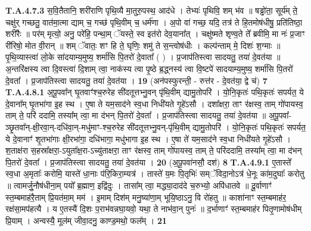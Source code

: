 \documentclass[17pt]{extarticle}
\begin{document}
                                                                  \textbf{ T.A.4.7.3} \newline
                  स॒वि॒तैतानि॒ शरी॑राणि पृथि॒व्यै मा॒तुरु॒पस्थ॒ आद॑धे । तेभ्यः॑ पृथिवि॒ शम् भ॑व ॥  षड्ढो॑ता॒ सूर्य॑म् ते॒ चक्षु॑र् गच्छतु॒ वात॑मा॒त्मा द्याम् च॒ गच्छ॑ पृथि॒वीम् च॒ धर्म॑णा ।  अ॒पो वा॑ गच्छ॒ यदि॒ तत्र॑ ते हि॒तमोष॑धीषु॒ प्रति॑तिष्ठा॒ शरी॑रैः ॥ पर॑म् मृत्यो॒ अनु॒ परे॑हि॒ पन्था॒म् ॅयस्ते॒ स्व इत॑रो देव॒याना᳚त् ।  चक्षु॑ष्मते शृण्व॒ते ते᳚ ब्रवीमि॒ मा नः॑ प्र॒जाꣳ री॑रिषो॒ मोत वी॒रान् ॥  शम् ॅवातः॒ शꣳ हि ते॒ घृणिः॒ शमु॑ ते स॒न्त्वोष॑धीः । कल्प॑न्ताम् मे॒ दिशः॑ श॒ग्माः ॥  पृ॒थि॒व्यास्त्वा॑ लो॒के सा॑दयाम्य॒मुष्य॒ शर्मा॑सि पि॒तरो॑ दे॒वाता᳚ ( ) । प्र॒जाप॑तिस्त्वा सादयतु॒ तया॑ दे॒वत॑या ॥ अ॒न्तरि॑क्षस्य त्वा दि॒वस्त्वा॑ दि॒शाम् त्वा॒ नाक॑स्य त्वा पृ॒ष्ठे ब्र॒द्ध्नस्य॑ त्वा वि॒ष्टपे॑ सादयाम्य॒मुष्य॒ शर्मा॑सि पि॒तरो॑ दे॒वता᳚ ।  प्र॒जाप॑तिस्त्वा सादयतु॒ तया॑ दे॒वत॑या । \textbf{ 19} \newline
                  \newline
                                                        (अन॑पस्फुरन्ती॒ - रुत्त॑र - दे॒वत॑या॒ द्वे च॑) \textbf{7} \newline \newline
                                \textbf{ T.A.4.8.1} \newline
                  अ॒पू॒पवा᳚न् घृ॒तवाꣳ॑श्च॒रुरेह सी॑दतूत्तभ्नु॒वन् पृ॑थि॒वीम् द्यामु॒तोपरि॑ । यो॒नि॒कृतः॑ पथि॒कृतः॑ सपर्यत॒ ये दे॒वाना᳚म् घृ॒तभा॑गा इ॒ह स्थ ।  ए॒षा ते यम॒साद॑ने स्व॒धा निधी॑यते गृ॒हे॑ऽसौ ।  दशा᳚क्षरा॒ ताꣳ र॑क्षस्व॒ ताम् गो॑पायस्व॒ ताम् ते॒ परि॑ ददामि॒ तस्या᳚म् त्वा॒ मा द॑भन् पि॒तरो॑ दे॒वता᳚ ।  प्र॒जाप॑तिस्त्वा सादयतु॒ तया॑ दे॒वत॑या ॥  अ॒पू॒पवा᳚-ञ्छृ॒तवा᳚न्-क्षी॒रवा॒न्-दधि॑वा॒न्-मधु॑माꣳ-श्च॒रुरेह सी॑दतूत्तभ्नु॒वन्-पृ॑थि॒वीम् द्यामु॒तोपरि॑ । यो॒नि॒कृतः॑ पथि॒कृतः॑ सपर्यत॒ ये दे॒वानाꣳ॑ शृ॒तभा॑गाः क्षी॒रभा॑गा॒ दधि॑भागा॒ मधु॑भागा इ॒ह स्थ । ए॒षा ते॑ यम॒साद॑ने स्व॒धा निधी॑यते गृ॒हे॑ऽसौ । श॒ताक्ष॑रा स॒हस्रा᳚क्षरा॒-ऽयुता᳚क्ष॒रा-ऽच्यु॑ताक्षरा॒ ताꣳ र॑क्षस्व॒ ताम् गो॑पायस्व॒ ताम् ते॒ परि॑ददामि॒ तस्या᳚म् त्वा॒ मा द॑भन् पि॒तरो॑ दे॒वता᳚ । प्र॒जाप॑तिस्त्वा सादयतु॒ तया॑ दे॒वत॑या । \textbf{ 20} \newline
                  \newline
                                                        (अ॒पू॒पवा॑नसौ॒ दश॑) \textbf{8} \newline \newline
                                \textbf{ T.A.4.9.1} \newline
                  ए॒तास्ते᳚ स्व॒धा अ॒मृताः᳚ करोमि॒ यास्ते॑ धा॒नाः प॑रि॒किरा॒म्यत्र॑ । तास्ते॑ य॒मः पि॒तृभिः॑ सम्ॅविदा॒नोऽत्र॑ धे॒नूः का॑म॒दुघाः᳚ करोतु ॥  त्वामर्जु॒नौष॑धीना॒म् पयो᳚ ब्र॒ह्माण॒ इद्वि॑दुः ।  तासा᳚म् त्वा॒ मद्ध्या॒दाद॑दे च॒रुभ्यो॒ अपि॑धातवे ॥  दू॒र्वाणाꣳ॑ स्त॒म्बमाह॑रै॒ताम् प्रि॒यत॑मा॒म् मम॑ । इ॒माम् दिश॑म् मनु॒ष्या॑णा॒म् भूयि॒ष्ठाऽनु॒ वि रो॑हतु ॥ काशा॑नाꣳ स्त॒म्बमाह॑र॒ रक्ष॑सा॒मप॑हत्यै ।  य ए॒तस्यै॑ दि॒शः प॒राभ॑वन्नघा॒यवो॒ यथा॒ ते नाभ॑वा॒न् पुनः॑ ॥ द॒र्भाणाꣳ॑ स्त॒म्बमाह॑र पितृ॒णामोष॑धीम् प्रि॒याम् । अन्वस्यै॒ मूल॑म् जीवा॒दनु॒ काण्ड॒मथो॒ फल᳚म् । \textbf{ 21} \newline
\end{document}
